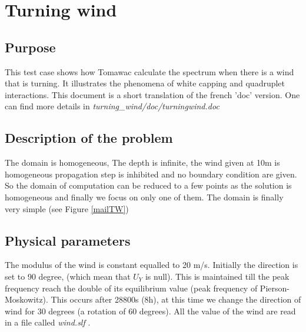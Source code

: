 \section{Turning wind}
%

%
\subsection{Purpose}
%
This test case shows how Tomawac calculate the spectrum when there is a wind that is turning. It illustrates the phenomena of white capping and quadruplet interactions.  This document is a short translation of the french 'doc' version. One can find more details in {\it turning\_wind/doc/turningwind.doc}

%
\subsection{Description of the problem}
%
The domain is homogeneous, The depth is infinite, the wind given at 10m is homogeneous  propagation step is inhibited and no boundary condition are given.
So the domain of computation can be reduced to a few points as the solution is homogeneous and finally we focus on only one of them. The domain is finally very simple (see Figure \ref{mailTW})


%
%
\subsection{Physical parameters}
%
The modulus of the wind is constant equalled to 20 m/s. Initially the direction is set to 90 degree, (which mean that $U_Y$ is null). This is maintained till the peak frequency reach the double of its equilibrium value (peak frequency of Pierson-Moskowitz). This occurs after 28800s (8h), at this time we change the direction of wind for 30 degrees (a rotation of 60 degrees). All the value of the wind are read in a file called {\it wind.slf   }.
%
%
